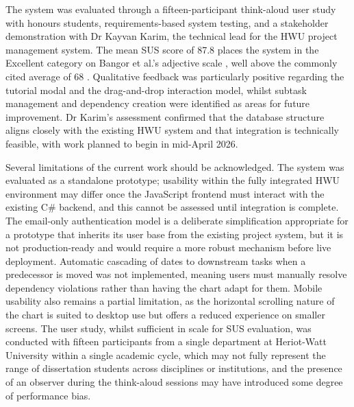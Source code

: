 \documentclass[12pt,nonacm,acmlarge,titlepage,screen]{acmart}
\begin{document}
The system was evaluated through a fifteen-participant think-aloud user study with honours students, requirements-based system testing, and a stakeholder demonstration with Dr Kayvan Karim, the technical lead for the HWU project management system. The mean SUS score of 87.8 places the system in the Excellent category on Bangor et al.'s adjective scale \cite{bangor_sus_2009}, well above the commonly cited average of 68 \cite{SAURO2012185}. Qualitative feedback was particularly positive regarding the tutorial modal and the drag-and-drop interaction model, whilst subtask management and dependency creation were identified as areas for future improvement. Dr Karim's assessment confirmed that the database structure aligns closely with the existing HWU system and that integration is technically feasible, with work planned to begin in mid-April 2026.

Several limitations of the current work should be acknowledged. The system was evaluated as a standalone prototype; usability within the fully integrated HWU environment may differ once the JavaScript frontend must interact with the existing C\# backend, and this cannot be assessed until integration is complete. The email-only authentication model is a deliberate simplification appropriate for a prototype that inherits its user base from the existing project system, but it is not production-ready and would require a more robust mechanism before live deployment. Automatic cascading of dates to downstream tasks when a predecessor is moved was not implemented, meaning users must manually resolve dependency violations rather than having the chart adapt for them. Mobile usability also remains a partial limitation, as the horizontal scrolling nature of the chart is suited to desktop use but offers a reduced experience on smaller screens. The user study, whilst sufficient in scale for SUS evaluation, was conducted with fifteen participants from a single department at Heriot-Watt University within a single academic cycle, which may not fully represent the range of dissertation students across disciplines or institutions, and the presence of an observer during the think-aloud sessions may have introduced some degree of performance bias.
\end{document}
